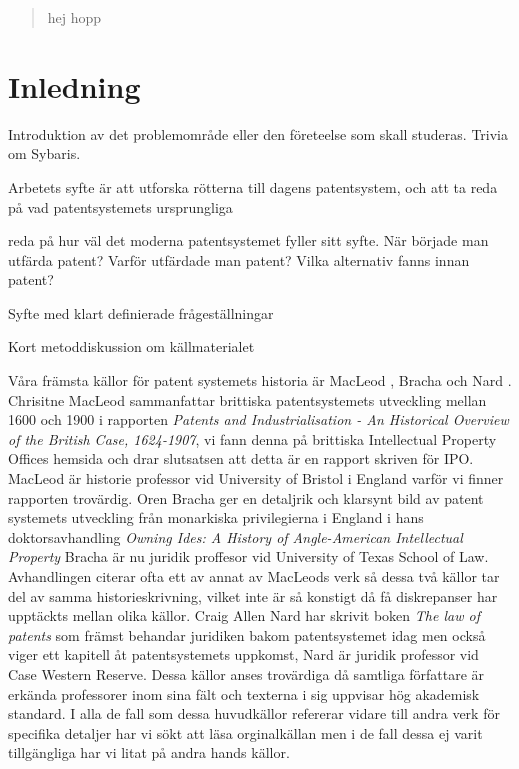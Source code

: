 
\begin{abstract}
	hej hopp
\end{abstract}	
	
	
\section{Inledning}
Introduktion av det problemområde eller den företeelse som skall studeras. 
Trivia om Sybaris.

Arbetets syfte är att utforska rötterna till dagens patentsystem, och att ta
reda på vad patentsystemets ursprungliga 

reda på hur väl det moderna patentsystemet fyller sitt syfte. När började man 
utfärda patent? Varför utfärdade man patent? Vilka alternativ fanns innan 
patent? 

Syfte med klart definierade frågeställningar

Kort metoddiskussion om källmaterialet


Våra främsta källor för patent systemets historia är MacLeod \cite{macleod}, Bracha \cite{bracha} och Nard
\cite{nard}. Chrisitne MacLeod sammanfattar brittiska patentsystemets utveckling mellan 1600 och 1900 i
rapporten \emph{Patents and Industrialisation - An Historical Overview of the British Case, 1624-1907}, vi
fann denna på brittiska Intellectual Property Offices hemsida och drar slutsatsen att detta är en rapport
skriven för IPO. MacLeod är historie professor vid University of Bristol i England varför vi finner
rapporten trovärdig. Oren Bracha ger en detaljrik och klarsynt bild av patent systemets utveckling från
monarkiska privilegierna i England i hans doktorsavhandling \emph{Owning Ides: A History of Angle-American
Intellectual Property} Bracha är nu juridik proffesor vid University of Texas School of Law. Avhandlingen
citerar ofta ett av annat av MacLeods verk så dessa två källor tar del av samma historieskrivning, vilket
inte är så konstigt då få diskrepanser har upptäckts mellan olika källor. Craig Allen Nard har skrivit
boken \emph{The law of patents} som främst behandar juridiken bakom patentsystemet idag men också viger ett
kapitell åt patentsystemets uppkomst, Nard är juridik professor vid Case Western Reserve. Dessa källor
anses trovärdiga då samtliga författare är erkända professorer inom sina fält och texterna i sig uppvisar
hög akademisk standard. I alla de fall som dessa huvudkällor refererar vidare till andra verk för specifika
detaljer har vi sökt att läsa orginalkällan men i de fall dessa ej varit tillgängliga har vi litat på andra
hands källor.

